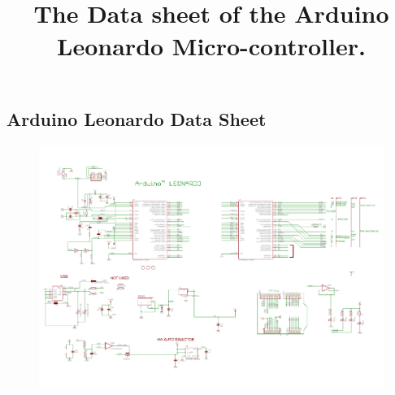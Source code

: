 \documentclass{article}
\begin{document}
\begin{appendices}
		\section{Arduino Leonardo Data Sheet}
		\begin{figure}[H]
			\centering
			\label{LeoDatasheet}
			\includegraphics*[scale = 0.75,angle=90]{ArduinoLeonardoDataSheet}
			\title{\\The Data sheet of the Arduino Leonardo Micro-controller.}
		\end{figure}
					
		
		
		\newpage
	
		
		
		\newpage	

		 		
	\end{appendices}
\end{document}
